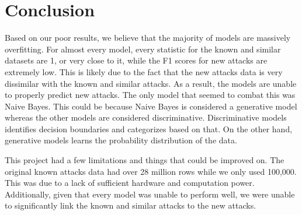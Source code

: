

\section{Conclusion}

Based on our poor results, we believe that the majority of models are massively overfitting. For almost every model, every statistic for the known and similar datasets are 1, or very close to it, while the F1 scores for new attacks are extremely low. This is likely due to the fact that the new attacks data is very dissimilar with the known and similar attacks. As a result, the models are unable to properly predict new attacks. The only model that seemed to combat this was Naive Bayes. This could be because Naive Bayes is considered a generative model whereas the other models are considered discriminative. Discriminative models identifies decision boundaries and categorizes based on that. On the other hand, generative models learns the probability distribution of the data.

This project had a few limitations and things that could be improved on. The original known attacks data had over 28 million rows while we only used 100,000. This was due to a lack of sufficient hardware and computation power. Additionally, given that every model was unable to perform well, we were unable to significantly link the known and similar attacks to the new attacks.

\ifCLASSOPTIONcaptionsoff
  \newpage
\fi




\vfill
